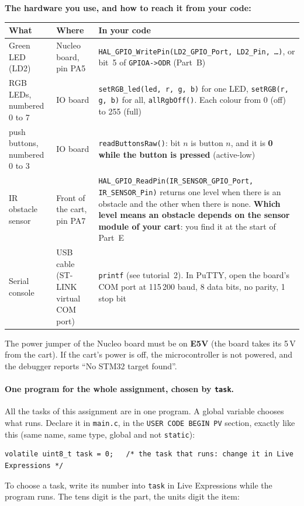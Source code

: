 \documentclass[11pt,a4paper]{article}
\begin{document}
\medskip\noindent
\begin{minipage}{\textwidth}
\textbf{The hardware you use, and how to reach it from your code:}\\[2pt]
\begin{tabularx}{\textwidth}{@{}>{\raggedright\arraybackslash}p{3.1cm} >{\raggedright\arraybackslash}p{3.2cm} L@{}}
\toprule
What & Where & In your code \\
\midrule
Green LED (LD2) & Nucleo board, pin PA5 & \texttt{HAL\_GPIO\_WritePin(LD2\_GPIO\_Port, LD2\_Pin, \ldots)}, or bit~5 of
  \texttt{GPIOA->ODR} (Part~B) \\
 RGB LEDs, numbered 0 to 7 & IO board & \texttt{setRGB\_led(led, r, g, b)} for one LED, \texttt{setRGB(r, g, b)} for all,
  \texttt{allRgbOff()}. Each colour from 0 (off) to 255 (full) \\
 push buttons, numbered 0 to 3 & IO board & \texttt{readButtonsRaw()}: bit $n$ is button $n$, and it is
  \textbf{0 while the button is pressed} (active-low) \\
\addlinespace
IR obstacle sensor & Front of the cart, pin PA7 & \texttt{HAL\_GPIO\_ReadPin(IR\_SENSOR\_GPIO\_Port, IR\_SENSOR\_Pin)}
  returns one level when there is an obstacle and the other when there is none. \textbf{Which level means an
  obstacle depends on the sensor module of your cart}: you find it at the start of Part~E \\
\addlinespace
Serial console & USB cable (ST-LINK virtual COM port) & \texttt{printf} (see tutorial~2). In PuTTY, open the board's
  COM port at 115\,200 baud, 8 data bits, no parity, 1 stop bit \\
\bottomrule
\end{tabularx}
\end{minipage}

\smallskip\noindent
The power jumper of the Nucleo board must be on \textbf{E5V} (the board takes its 5\,V from the cart). If the
cart's power is off, the microcontroller is not powered, and the debugger reports ``No STM32 target found''.

\paragraph{One program for the whole assignment, chosen by \texttt{task}.}
All the tasks of this assignment are in one program. A global variable chooses what runs. Declare it in
\texttt{main.c}, in the \texttt{USER CODE BEGIN PV} section, exactly like this (same name, same type, global and not
\texttt{static}):
\begin{lstlisting}
volatile uint8_t task = 0;   /* the task that runs: change it in Live Expressions */
\end{lstlisting}
To choose a task, write its number into \texttt{task} in Live Expressions while the program runs. The tens digit is
the part, the units digit the item:
\end{document}
